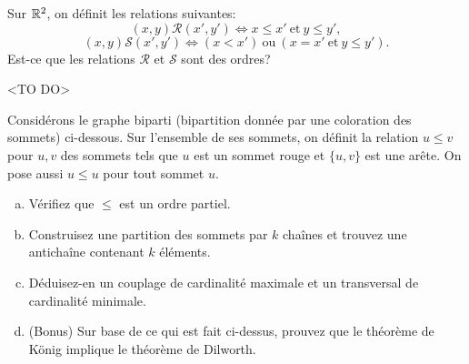 \begin{exo}
Sur $\mathbb{R}^2$, on d\'efinit les relations suivantes:
\[(x,y)\mathcal{R}(x',y') \Leftrightarrow x \leq x' \mathrm{~et~} y \leq y', \]
\[(x,y)\mathcal{S}(x',y') \Leftrightarrow (x < x') \mathrm{~ou~} (x = x' \mathrm{~et~} y \leq y').\]
Est-ce que les relations $\mathcal{R}$ et $\mathcal{S}$ sont des ordres?
\end{exo}

<TO DO>


\begin{exo}
Consid\'erons le graphe biparti (bipartition donn\'ee par une coloration des sommets) ci-dessous. Sur l'ensemble de ses sommets, on d\'efinit la relation $u\leq v$ pour $u,v$ des sommets tels que $u$ est un sommet rouge et $\{u,v\}$ est une ar\^ete. On pose aussi $u\leq u$ pour tout sommet $u$. \\
\begin{enumerate}[(a)]
\item V\'erifiez que $\leq$ est un ordre partiel.
\item Construisez une partition des sommets par $k$ cha\^ines et trouvez une anticha\^ine contenant $k$ \'el\'ements.
\item D\'eduisez-en un couplage de cardinalit\'e maximale et un transversal de cardinalit\'e minimale. 
\item (Bonus) Sur base de ce qui est fait ci-dessus, prouvez que le th\'eor\`eme de K\"onig implique le th\'eor\`eme de Dilworth.
\end{enumerate}
\end{exo}

\begin{figure}[!h]
\begin{center}

\end{center}
\caption{}
\end{figure}

